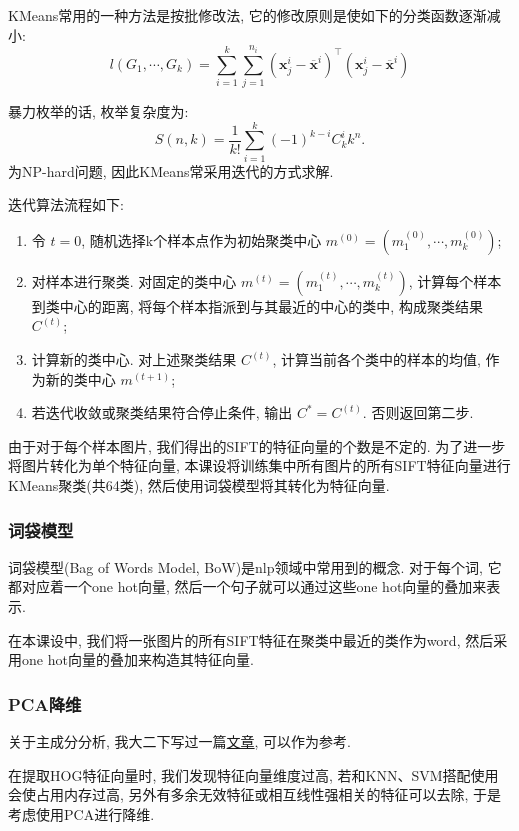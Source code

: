 \documentclass[lang=cn,12pt,a4paper]{elegantpaper}
\begin{document}
KMeans常用的一种方法是按批修改法, 它的修改原则是使如下的分类函数逐渐减小:
\begin{equation*}
    l(G_1,\cdots, G_k) = \sum_{i=1}^k \sum_{j=1}^{n_i}(\bm{x}_j^i-\overline{\bm{x}}^i)^\top(\bm{x}_j^i-\overline{\bm{x}}^i)
\end{equation*}

暴力枚举的话, 枚举复杂度为:
\begin{equation*}
    S(n, k) = \frac{1}{k!}\sum_{i=1}^k(-1)^{k-i}C_k^i k^n.   
\end{equation*}
为NP-hard问题, 因此KMeans常采用迭代的方式求解.

迭代算法流程如下:
\begin{enumerate}
    \item 令 $t=0$, 随机选择k个样本点作为初始聚类中心 $m^{(0)}=(m_1^{(0)}, \cdots, m_k^{(0)})$;
    \item 对样本进行聚类. 对固定的类中心 $m^{(t)}=(m_1^{(t)}, \cdots, m_k^{(t)})$, 计算每个样本到类中心的距离, 将每个样本指派到与其最近的中心的类中, 构成聚类结果 $C^{(t)}$;
    \item 计算新的类中心. 对上述聚类结果 $C^{(t)}$, 计算当前各个类中的样本的均值, 作为新的类中心 $m^{(t+1)}$;
    \item 若迭代收敛或聚类结果符合停止条件, 输出 $C^{*}=C^{(t)}$. 否则返回第二步.
\end{enumerate}

由于对于每个样本图片, 我们得出的SIFT的特征向量的个数是不定的. 为了进一步将图片转化为单个特征向量, 本课设将训练集中所有图片的所有SIFT特征向量进行KMeans聚类(共64类), 然后使用词袋模型将其转化为特征向量.

\subsubsection{词袋模型}
词袋模型(Bag of Words Model, BoW)是nlp领域中常用到的概念. 对于每个词, 它都对应着一个one hot向量, 然后一个句子就可以通过这些one hot向量的叠加来表示.

在本课设中, 我们将一张图片的所有SIFT特征在聚类中最近的类作为word, 然后采用one hot向量的叠加来构造其特征向量.

\subsubsection{PCA降维}
关于主成分分析, 我大二下写过一篇\href{https://zhuanlan.zhihu.com/p/625837046}{文章}, 可以作为参考.

在提取HOG特征向量时, 我们发现特征向量维度过高, 若和KNN、SVM搭配使用会使占用内存过高, 另外有多余无效特征或相互线性强相关的特征可以去除, 于是考虑使用PCA进行降维.
\end{document}
